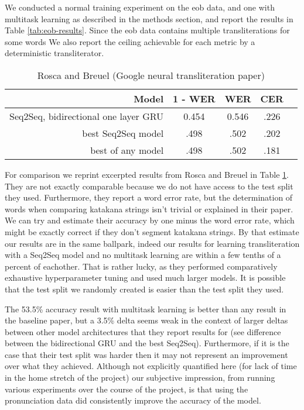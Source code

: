 \documentclass{article}
\begin{document}
We conducted a normal training experiment on the eob data,
and one with multitask learning as described in the methods section,
and report the results in Table \ref{tab:eob-results}.
Since the eob data contains multiple transliterations for some words
We also report the ceiling achievable for each metric
by a deterministic transliterator.

\begin{table}[h]
  \centering
  \begin{tabular}{r | c c c c}
    Model & 1 - WER & WER & CER \\
    \hline
    Seq2Seq, bidirectional one layer GRU & 0.454 & 0.546 & .226 \\
    best Seq2Seq model & .498 & .502 & .202 \\
    best of any model & .498 & .502 & .181 \\
  \end{tabular}
  \caption{Rosca and Breuel \cite{Rosca2016SequencetosequenceNN} (Google neural
    transliteration paper)}
  \label{tab:baseline-results}
\end{table}

For comparison we reprint excerpted results
from Rosca and Breuel \cite{Rosca2016SequencetosequenceNN}
in Table \ref{tab:baseline-results}.
They are not exactly comparable
because we do not have access to the test split they used.
Furthermore,
they report a word error rate,
but the determination of words when comparing katakana strings
isn't trivial or explained in their paper.
We can try and estimate their accuracy
by one minus the word error rate,
which might be exactly correct if they don't segment katakana strings.
By that estimate our results are in the same ballpark,
indeed our results for learning transliteration
with a Seq2Seq model and no multitask learning
are within a few tenths of a percent of eachother.
That is rather lucky,
as they performed comparatively exhaustive hyperparameter tuning
and used much larger models.
It is possible that the test split we randomly created
is easier than the test split they used.

The 53.5\% accuracy result with multitask learning
is better than any result in the baseline paper,
but a 3.5\% delta seems weak
in the context of larger deltas between other model architectures
that they report results for
(see difference between the bidirectional GRU and the best Seq2Seq).
Furthermore,
if it is the case that their test split was harder
then it may not represent an improvement over what they achieved.
Although not explicitly quantified here
(for lack of time in the home stretch of the project)
our subjective impression,
from running various experiments over the course of the project,
is that using the pronunciation data
did consistently improve the accuracy of the model.
\end{document}
